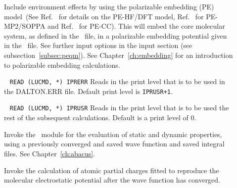 \begin{description}


\item[] Include environment effects by using the polarizable embedding (PE)
model~(See Ref.~\cite{pescf} for details on the PE-HF/DFT model, Ref.~\cite{pesoppa}
for PE-MP2/SOPPA and Ref.~\cite{pecc} for PE-CC).
This will embed the core molecular system, as defined in the \molinp\ file, in a
polarizable embedding potential given in the \potinp\ file. See further input options
in the  input section (see subsection~\ref{subsec:peqm}). See
Chapter~\ref{ch:embedding} for an introduction to polarizable embedding calculations.

\item[]\verb| |\newline
\verb|READ (LUCMD, *) IPRERR|
 
Reads in the print level that is to be used in the DALTON.ERR
file. Default print level is \verb|IPRUSR+1|.

\item[]\verb| |\newline
\verb|READ (LUCMD, *) IPRUSR|
Reads in the print level that is to be used the rest of the subsequent
calculations. Default is a print level of 0.

\item[] Invoke the \aba\ module for the evaluation of static
and dynamic properties, using a previously converged and saved wave function and saved integral files. See Chapter~\ref{ch:abacus}.

\item[] Invoke the calculation of atomic partial charges fitted to reproduce
the molecular electrostatic potential after the wave function has converged.


\end{description}
